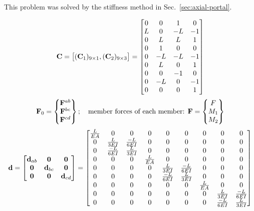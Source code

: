\begin{example}[2D frame]
This problem was solved by the stiffness method in Sec.~\ref{sec:axial-portal}.
\begin{fig}
  
\end{fig}
\begin{equation*}
  \mathbf{C} = \bigl[(\mathbf{C}_1)_{9\times1}, (\mathbf{C}_2)_{9\times3}\bigr] =
  \begin{bmatrix}
    0 & 0 & 1 & 0\\ L & 0 & -L & -1\\ 0 & L & L & 1\\ 0 & 1 & 0 & 0\\ 0 & -L & -L & -1\\ 0 & L & 0 & 1\\ 0 & 0 & -1 & 0\\ 0 & -L & 0 & -1\\ 0 & 0 & 0 & 1
  \end{bmatrix}
\end{equation*}
\begin{equation*}
  \mathbf{F}_0 = \begin{Bmatrix}\mathbf{F}^{ab}\\ \mathbf{F}^{bc}\\ \mathbf{F}^{cd}\end{Bmatrix};\quad\text{member forces of each member: } \mathbf{F} = \begin{Bmatrix}F\\ M_1\\ M_2\end{Bmatrix}
\end{equation*}
{\small
\begin{equation*}
  \mat{d} = \bmat{\mat{d}_{ab} & \mat{0} & \mat{0}\\ \mat{0} & \mat{d}_{bc} & \mat{0}\\ \mat{0} & \mat{0} & \mat{d}_{cd}} =
  \begin{bmatrix}
    \frac{L}{EA} & 0 & 0 & 0 & 0 & 0 & 0 & 0 & 0\\
    0 & \frac{L}{3EI} & \frac{-L}{6EI} & 0 & 0 & 0 & 0 & 0 & 0\\
    0 & \frac{-L}{6EI} & \frac{L}{3EI} & 0 & 0 & 0 & 0 & 0 & 0\\
    0 & 0 & 0 & \frac{L}{EA} & 0 & 0 & 0 & 0 & 0\\
    0 & 0 & 0 & 0 & \frac{L}{3EI} & \frac{-L}{6EI} & 0 & 0 & 0\\
    0 & 0 & 0 & 0 & \frac{-L}{6EI} & \frac{L}{3EI} & 0 & 0 & 0\\
    0 & 0 & 0 & 0 & 0 & 0 & \frac{L}{EA} & 0 & 0\\
    0 & 0 & 0 & 0 & 0 & 0 & 0 & \frac{L}{3EI} & \frac{-L}{6EI}\\
    0 & 0 & 0 & 0 & 0 & 0 & 0 & \frac{-L}{6EI} & \frac{L}{3EI}
  \end{bmatrix}

\end{equation*}}
\end{example}
